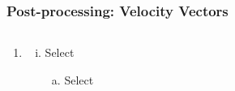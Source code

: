 \documentclass[10pt,compress, unknownkeysallowed]{beamer}
\begin{document}
\begin{frame}
  \frametitle{Post-processing: Velocity Vectors}
    \begin{columns}
        \begin{column}[l]{0.5\linewidth}
           \begin{enumerate}\scriptsize\setcounter{enumi}{1}
                \item<1-> 
                    \begin{enumerate}[i)]\scriptsize
                       \item<2-> Select 
                       \begin{enumerate}[(a)]\scriptsize
                          \item<2->  Select
                       \end{enumerate}
                    \end{enumerate}                    
           \end{enumerate}
        \end{column}
           \begin{column}[l]{0.5\linewidth}
           \end{column}
    \end{columns}
\end{frame}
\end{document}
